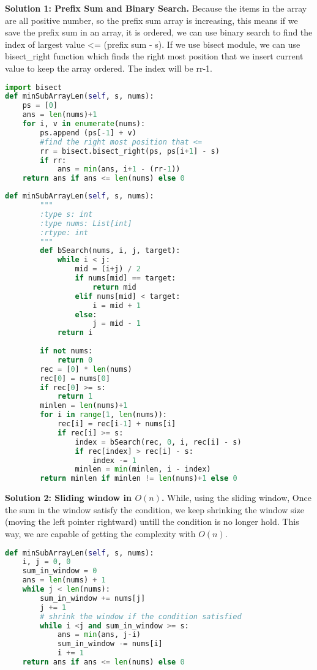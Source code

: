 \documentclass[../main.tex]{subfiles}
\begin{document}
\begin{examples}[resume]
\textbf{Solution 1: Prefix Sum and Binary Search.} Because the items in the array are all positive number, so the prefix sum array is increasing,  this means if we save the prefix sum in an array, it is ordered,  we can use binary search to find the index of largest value <= (prefix sum - s). If we use bisect module, we can use bisect\_right function which finds the right most position that we insert current value to keep the array ordered. The index will be rr-1. 
\begin{lstlisting}[language=Python]
import bisect
def minSubArrayLen(self, s, nums):
    ps = [0]
    ans = len(nums)+1
    for i, v in enumerate(nums):
        ps.append (ps[-1] + v)
        #find the right most position that <=
        rr = bisect.bisect_right(ps, ps[i+1] - s)
        if rr:
            ans = min(ans, i+1 - (rr-1))
    return ans if ans <= len(nums) else 0
\end{lstlisting}
\begin{lstlisting}[language = Python]
    def minSubArrayLen(self, s, nums):
        """
        :type s: int
        :type nums: List[int]
        :rtype: int
        """
        def bSearch(nums, i, j, target):
            while i < j:
                mid = (i+j) / 2
                if nums[mid] == target:
                    return mid
                elif nums[mid] < target:
                    i = mid + 1
                else:
                    j = mid - 1
            return i   
        
        if not nums:
            return 0
        rec = [0] * len(nums)
        rec[0] = nums[0]
        if rec[0] >= s:
            return 1
        minlen = len(nums)+1
        for i in range(1, len(nums)):
            rec[i] = rec[i-1] + nums[i]
            if rec[i] >= s:
                index = bSearch(rec, 0, i, rec[i] - s)
                if rec[index] > rec[i] - s:
                    index -= 1
                minlen = min(minlen, i - index)
        return minlen if minlen != len(nums)+1 else 0
\end{lstlisting}

\textbf{Solution 2: Sliding window in $O(n)$.}  While, using the sliding window, Once the sum in the window satisfy the condition, we keep shrinking the window size (moving the left pointer rightward) untill the condition is no longer hold. This way, we are capable of getting the complexity with $O(n)$. 
\begin{lstlisting}[language = Python]
def minSubArrayLen(self, s, nums):
    i, j = 0, 0
    sum_in_window = 0
    ans = len(nums) + 1
    while j < len(nums):
        sum_in_window += nums[j]
        j += 1
        # shrink the window if the condition satisfied
        while i <j and sum_in_window >= s:
            ans = min(ans, j-i)
            sum_in_window -= nums[i]
            i += 1
    return ans if ans <= len(nums) else 0
\end{lstlisting}


\end{examples}
\end{document}
